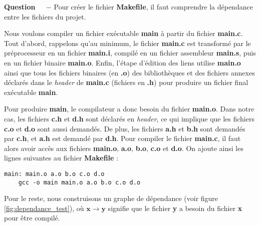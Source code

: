 \documentclass[11pt]{article}
\newcounter{question}[section]
\newenvironment{question}[1][]{\refstepcounter{question}\par\medskip
   \noindent\textbf{Question~\thequestion ~ $-$} \rmfamily}{}
\begin{document}
\begin{question} %
Pour créer le fichier \textbf{Makefile}, il faut comprendre la dépendance entre les fichiers du projet.

Nous voulons compiler un fichier exécutable \textbf{main} à partir du fichier \textbf{main.c}. Tout d'abord, rappelons qu'au minimum, le fichier \textbf{main.c} est transformé par le préprocesseur en un fichier \textbf{main.i}, compilé en un fichier assembleur \textbf{main.s}, puis en un fichier binaire \textbf{main.o}. Enfin, l'étape d'édition des liens utilise \textbf{main.o} ainsi que tous les fichiers binaires (en \textbf{.o}) des bibliothèques et des fichiers annexes déclarés dans le \textit{header} de \textbf{main.c} (fichiers en \textbf{.h}) pour produire un fichier final exécutable \textbf{main}.


Pour produire \textbf{main}, le compilateur a donc besoin du fichier \textbf{main.o}. Dans notre cas, les fichiers \textbf{c.h} et \textbf{d.h} sont déclarés en \textit{header}, ce qui implique que les fichiers \textbf{c.o} et \textbf{d.o} sont aussi demandés. De plus, les fichiers \textbf{a.h} et \textbf{b.h} sont demandés par \textbf{c.h}, et \textbf{a.h} est demandé par \textbf{d.h}. Pour compiler le fichier \textbf{main.c}, il faut alors avoir accès aux fichiers \textbf{main.o}, \textbf{a.o}, \textbf{b.o}, \textbf{c.o} et \textbf{d.o}.
On ajoute ainsi les lignes suivantes au fichier \textbf{Makefile} :
\begin{verbatim}
main: main.o a.o b.o c.o d.o
    gcc -o main main.o a.o b.o c.o d.o
\end{verbatim}

Pour le reste, nous construisons un graphe de dépendance (voir figure \ref{fig:dependance_test}), où $\mathbf{x}\rightarrow \mathbf{y}$ signifie que le fichier \textbf{y} a besoin du fichier \textbf{x} pour être compilé.



\end{question}
\end{document}

